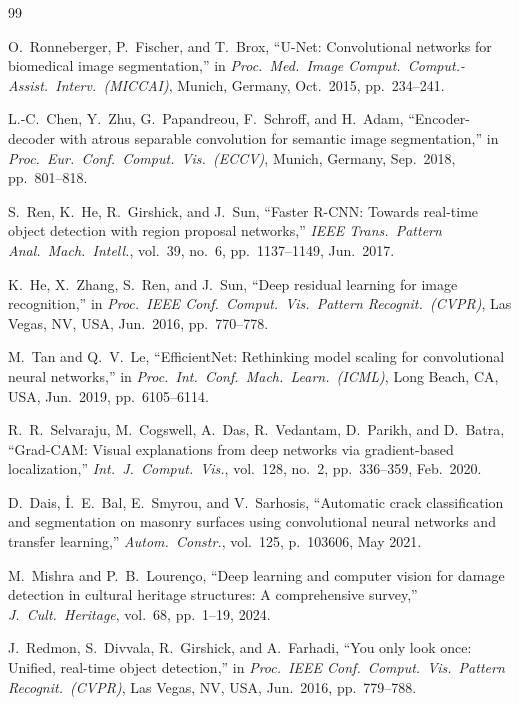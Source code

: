 \documentclass[12pt,a4paper]{article}
\begin{document}
\clearpage
\begin{thebibliography}{99}

O.~Ronneberger, P.~Fischer, and T.~Brox,
``U-Net: Convolutional networks for biomedical image segmentation,''
in \textit{Proc.\ Med.\ Image Comput.\ Comput.-Assist.\ Interv.\ (MICCAI)},
Munich, Germany, Oct.\ 2015, pp.\ 234--241.

L.-C.~Chen, Y.~Zhu, G.~Papandreou, F.~Schroff, and H.~Adam,
``Encoder-decoder with atrous separable convolution for semantic image segmentation,''
in \textit{Proc.\ Eur.\ Conf.\ Comput.\ Vis.\ (ECCV)},
Munich, Germany, Sep.\ 2018, pp.\ 801--818.

S.~Ren, K.~He, R.~Girshick, and J.~Sun,
``Faster R-CNN: Towards real-time object detection with region proposal networks,''
\textit{IEEE Trans.\ Pattern Anal.\ Mach.\ Intell.},
vol.\ 39, no.\ 6, pp.\ 1137--1149, Jun.\ 2017.

K.~He, X.~Zhang, S.~Ren, and J.~Sun,
``Deep residual learning for image recognition,''
in \textit{Proc.\ IEEE Conf.\ Comput.\ Vis.\ Pattern Recognit.\ (CVPR)},
Las Vegas, NV, USA, Jun.\ 2016, pp.\ 770--778.

M.~Tan and Q.~V.~Le,
``EfficientNet: Rethinking model scaling for convolutional neural networks,''
in \textit{Proc.\ Int.\ Conf.\ Mach.\ Learn.\ (ICML)},
Long Beach, CA, USA, Jun.\ 2019, pp.\ 6105--6114.

R.~R.~Selvaraju, M.~Cogswell, A.~Das, R.~Vedantam, D.~Parikh, and D.~Batra,
``Grad-CAM: Visual explanations from deep networks via gradient-based localization,''
\textit{Int.\ J.\ Comput.\ Vis.},
vol.\ 128, no.\ 2, pp.\ 336--359, Feb.\ 2020.

D.~Dais, \.{I}.~E.~Bal, E.~Smyrou, and V.~Sarhosis,
``Automatic crack classification and segmentation on masonry surfaces using convolutional neural networks and transfer learning,''
\textit{Autom.\ Constr.},
vol.\ 125, p.\ 103606, May 2021.

M.~Mishra and P.~B.~Louren\c{c}o,
``Deep learning and computer vision for damage detection in cultural heritage structures: A comprehensive survey,''
\textit{J.\ Cult.\ Heritage},
vol.\ 68, pp.\ 1--19, 2024.

J.~Redmon, S.~Divvala, R.~Girshick, and A.~Farhadi,
``You only look once: Unified, real-time object detection,''
in \textit{Proc.\ IEEE Conf.\ Comput.\ Vis.\ Pattern Recognit.\ (CVPR)},
Las Vegas, NV, USA, Jun.\ 2016, pp.\ 779--788.


\end{thebibliography}
\end{document}
